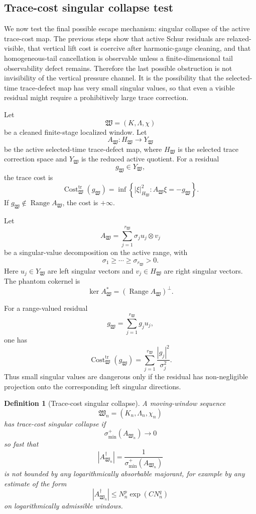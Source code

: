 \documentclass[11pt]{article}
\numberwithin{equation}{section}
\newtheorem{definition}[theorem]{Definition}
\begin{document}
\subsection{Trace-cost singular collapse test}

We now test the final possible escape mechanism: singular collapse of the active trace-cost map. The previous steps show that active Schur residuals are relaxed-visible, that vertical lift cost is coercive after harmonic-gauge cleaning, and that homogeneous-tail cancellation is observable unless a finite-dimensional tail observability defect remains. Therefore the last possible obstruction is not invisibility of the vertical pressure channel. It is the possibility that the selected-time trace-defect map has very small singular values, so that even a visible residual might require a prohibitively large trace correction.

Let
\[
\mathfrak W=(K,\Lambda,\chi)
\]
be a cleaned finite-stage localized window. Let
\[
A_{\mathfrak W}:H_{\mathfrak W}\to Y_{\mathfrak W}
\]
be the active selected-time trace-defect map, where \(H_{\mathfrak W}\) is the selected trace correction space and \(Y_{\mathfrak W}\) is the reduced active quotient. For a residual
\[
g_{\mathfrak W}\in Y_{\mathfrak W},
\]
the trace cost is
\[
\operatorname{Cost}^{\operatorname{tr}}_{\mathfrak W}(g_{\mathfrak W}) =
\inf\left\{ |\xi|_{H_{\mathfrak W}}^2 : A_{\mathfrak W}\xi=-g_{\mathfrak W} \right\}.
\]
If \(g_{\mathfrak W}\notin \operatorname{Range}A_{\mathfrak W}\), the cost is \(+\infty\).

Let
\[
A_{\mathfrak W} =
\sum_{j=1}^{r_{\mathfrak W}}\sigma_j u_j\otimes v_j
\]
be a singular-value decomposition on the active range, with
\[
\sigma_1\ge\cdots\ge\sigma_{r_{\mathfrak W}}>0.
\]
Here \(u_j\in Y_{\mathfrak W}\) are left singular vectors and \(v_j\in H_{\mathfrak W}\) are right singular vectors. The phantom cokernel is
\[
\ker A_{\mathfrak W}^* =
(\operatorname{Range}A_{\mathfrak W})^\perp.
\]

For a range-valued residual
\[
g_{\mathfrak W}=\sum_{j=1}^{r_{\mathfrak W}}g_j u_j,
\]
one has
\begin{equation}
\operatorname{Cost}^{\operatorname{tr}}_{\mathfrak W}(g_{\mathfrak W}) =
\sum_{j=1}^{r_{\mathfrak W}}
\frac{|g_j|^2}{\sigma_j^2}.
\label{eq:tag-10-235}
\end{equation}
Thus small singular values are dangerous only if the residual has non-negligible projection onto the corresponding left singular directions.

\begin{definition}[Trace-cost singular collapse]
A moving-window sequence
\[
\mathfrak W_n=(K_n,\Lambda_n,\chi_n)
\]
has trace-cost singular collapse if
\[
\sigma_{\min}^+(A_{\mathfrak W_n})
\to0
\]
so fast that
\[
|A_{\mathfrak W_n}^{\dagger}| =
\frac1{\sigma_{\min}^+(A_{\mathfrak W_n})}
\]
is not bounded by any logarithmically absorbable majorant, for example by any estimate of the form
\[
|A_{\mathfrak W_n}^{\dagger}|
\le
N_n^p\exp(CN_n^q)
\]
on logarithmically admissible windows.
\end{definition}
\end{document}
